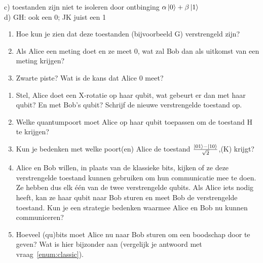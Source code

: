 \documentclass[../../main.tex]{subfiles}
\begin{document}
\begin{antwoord}
c) toestanden zijn niet te isoleren door ontbinging $\alpha\ket{0}+\beta\ket{1}$\\
d) GH: ook een 0; JK juist een 1\\

\end{antwoord}
\begin{enumerate}[resume]
\item \label{enum:classic}Hoe kun je zien dat deze toestanden (bijvoorbeeld G) verstrengeld zijn? 
\item Als Alice een meting doet en ze meet 0, wat zal Bob dan als uitkomst van een meting krijgen? 
\item Zwarte piste? Wat is de kans dat Alice 0 meet? 
\end{enumerate}
\begin{enumerate}[resume]
\item Stel, Alice doet een X-rotatie op haar qubit, wat gebeurt er dan met haar qubit? En met Bob's qubit? Schrijf de nieuwe verstrengelde toestand op. 
\item Welke quantumpoort moet Alice op haar qubit toepassen om de toestand H te krijgen? 
\item Kun je bedenken met welke poort(en) Alice de toestand $\frac{\ket{01}-\ket{10}}{\sqrt{2}}$,(K) krijgt? 
\item Alice en Bob willen, in plaats van de klassieke bits, kijken of ze deze verstrengelde toestand kunnen gebruiken om hun communicatie mee te doen. Ze hebben dus elk \'e\'en van de twee verstrengelde qubits. Als Alice iets nodig heeft, kan ze haar qubit naar Bob sturen en meet Bob de verstrengelde toestand. Kun je een strategie bedenken waarmee Alice en Bob nu kunnen communiceren?

\item Hoeveel (qu)bits moet Alice nu naar Bob sturen om een boodschap door te geven? Wat is hier bijzonder aan (vergelijk je antwoord met vraag~\ref{enum:classic}).
\end{enumerate}
\end{document}
